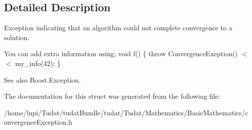\subsection{Detailed Description}
Exception indicating that an algorithm could not complete convergence to a solution. 

You can add extra information using; void f() \{ throw Convergence\+Exeption() $<$$<$ my\+\_\+info(42); \}

\begin{DoxySeeAlso}{See also}
Boost.\+Exception. 
\end{DoxySeeAlso}


The documentation for this struct was generated from the following file\+:\begin{DoxyCompactItemize}
\item 
/home/lupi/\+Tudat/tudat\+Bundle/tudat/\+Tudat/\+Mathematics/\+Basic\+Mathematics/convergence\+Exception.\+h\end{DoxyCompactItemize}
